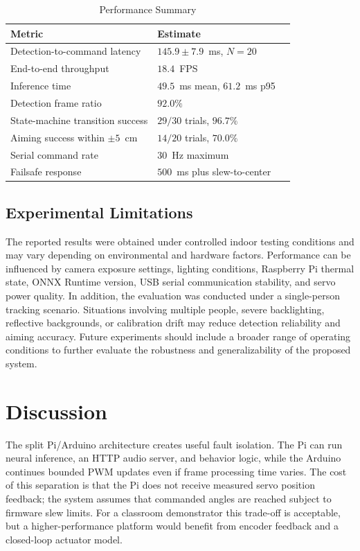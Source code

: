 \documentclass[lettersize,journal]{IEEEtran}
\begin{document}
\begin{table}[!t]
\caption{Performance Summary}
\label{tab:results}
\centering
\footnotesize
\renewcommand{\arraystretch}{1.12}
\begin{tabular}{|p{}|p{}|p{}|}
\hline
\textbf{Metric} & \textbf{Estimate}\\
\hline
Detection-to-command latency & $145.9 \pm 7.9$~ms, $N=20$\\
\hline
End-to-end throughput & $18.4$~FPS\\
\hline
Inference time & $49.5$~ms mean, $61.2$~ms p95\\
\hline
Detection frame ratio & $92.0\%$ \\
\hline
State-machine transition success & $29/30$ trials, $96.7\%$\\
\hline
Aiming success within $\pm5$~cm & $14/20$ trials, $70.0\%$\\
\hline
Serial command rate & $30$~Hz maximum\\
\hline
Failsafe response & $500$~ms plus slew-to-center\\
\hline
\end{tabular}
\end{table}

\subsection{Experimental Limitations}
The reported results were obtained under controlled indoor testing conditions and may vary depending on environmental and hardware factors. Performance can be influenced by camera exposure settings, lighting conditions, Raspberry Pi thermal state, ONNX Runtime version, USB serial communication stability, and servo power quality. In addition, the evaluation was conducted under a single-person tracking scenario. Situations involving multiple people, severe backlighting, reflective backgrounds, or calibration drift may reduce detection reliability and aiming accuracy. Future experiments should include a broader range of operating conditions to further evaluate the robustness and generalizability of the proposed system.

\section{Discussion}
\label{sec:discussion}
The split Pi/Arduino architecture creates useful fault isolation. The Pi can run neural inference, an HTTP audio server, and behavior logic, while the Arduino continues bounded PWM updates even if frame processing time varies. The cost of this separation is that the Pi does not receive measured servo position feedback; the system assumes that commanded angles are reached subject to firmware slew limits. For a classroom demonstrator this trade-off is acceptable, but a higher-performance platform would benefit from encoder feedback and a closed-loop actuator model.
\end{document}
